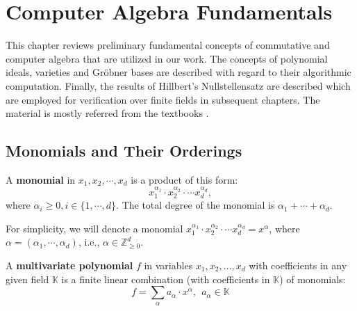 
\chapter{Computer Algebra Fundamentals} \label{ch:ideals}
This chapter reviews preliminary fundamental concepts of commutative and computer algebra that are 
utilized in our work. The concepts of polynomial ideals, varieties and Gr\"obner bases are described with regard to their
algorithmic computation. Finally, the results of Hillbert's Nullstellensatz are described which are employed 
for verification over finite fields in subsequent chapters. The material is mostly referred from 
the textbooks \cite{ideals:book} \cite{gb_book}. 

\section{Monomials and Their Orderings}

\begin{Definition} \label{def:mono}
A {\bf monomial} in $x_1,x_2,\cdots,x_d$ is a product of this form:
\begin{equation}
x_1^{{\alpha}_1} \cdot x_2^{{\alpha}_2} \cdot \cdots x_d^{{\alpha}_d},
\end{equation}
where $\alpha_i \ge 0, i\in\{1,\cdots,d\}$. 
The total degree of the monomial is $\alpha_{1}+\cdots+\alpha_{d}$.
\end{Definition}

For simplicity, we will denote a monomial $x_1^{{\alpha}_1} \cdot x_2^{{\alpha}_2} \cdot \cdots x_d^{{\alpha}_d}=x^{\alpha}$, 
where $\alpha=({\alpha}_1,\cdots,{\alpha}_d)$, i.e., $\alpha \in \mathbb{Z}_{\ge 0}^{d}$.
  

\begin{Definition}
A {\bf multivariate polynomial} $f$ in variables $x_1, x_2, \ldots, x_d$ with coefficients in any 
given field $\mathbb{K}$ is a finite linear combination (with coefficients in $\mathbb{K}$) of monomials:
\begin{equation}
	f=\sum_{\alpha}a_{\alpha}\cdot x^{\alpha}, ~~a_{\alpha}\in \mathbb{K} \nonumber
\end{equation}
\end{Definition}

